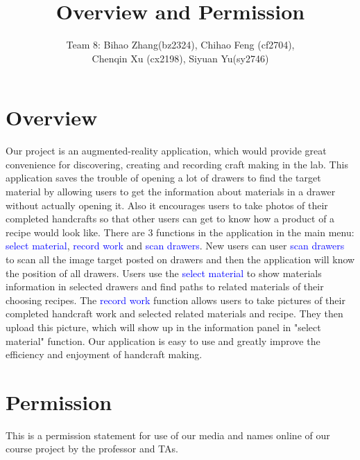 \documentclass[10pt]{article}
\title{Overview and Permission}
\author{Team 8: Bihao Zhang(bz2324), Chihao Feng (cf2704), \\Chenqin Xu (cx2198), Siyuan Yu(sy2746)}
\begin{document}
\maketitle
\section{Overview}
Our project is an augmented-reality application, which would provide great convenience for discovering, creating and recording craft making in the lab. This application saves the trouble of opening a lot of drawers to find the target material by allowing users to get the information about materials in a drawer without actually opening it. Also it encourages users to take photos of their completed handcrafts so that other users can get to know how a product of a recipe would look like. There are 3 functions in the application in the main menu: \textcolor{blue}{select material}, \textcolor{blue}{record work} and \textcolor{blue}{scan drawers}. New users can user \textcolor{blue}{scan drawers} to scan all the image target posted on drawers and then the application will know the position of all drawers. Users use the \textcolor{blue}{select material} to show materials information in selected drawers and find paths to related materials of their choosing recipes. The \textcolor{blue}{record work} function allows users to take pictures of their completed handcraft work and selected related materials and recipe. They then upload this picture, which will show up in the information panel in "select material" function. Our application is easy to use and greatly improve the efficiency and enjoyment of handcraft making.


\section{Permission}
This is a permission statement for use of our media and names online of our course project by the professor and TAs.
\end{document}
